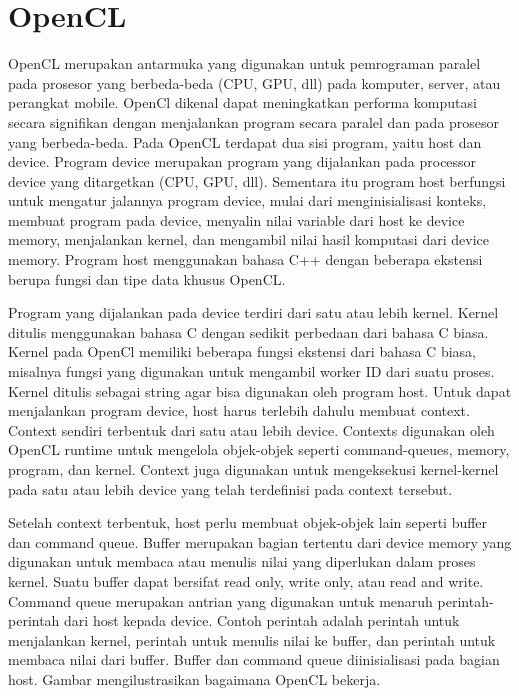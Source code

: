 \section{OpenCL}
OpenCL merupakan antarmuka yang digunakan untuk pemrograman paralel pada prosesor yang berbeda-beda (CPU, GPU, dll) pada komputer, server, atau perangkat mobile. 
OpenCl dikenal dapat meningkatkan performa komputasi secara signifikan dengan menjalankan program secara paralel dan pada prosesor yang berbeda-beda.
Pada OpenCL terdapat dua sisi program, yaitu host dan device. Program device merupakan program yang dijalankan pada processor device yang ditargetkan (CPU, GPU, dll). Sementara itu program host berfungsi untuk mengatur jalannya program device, mulai dari menginisialisasi konteks, membuat program pada device, menyalin nilai variable dari host ke device memory, menjalankan kernel, dan mengambil nilai hasil komputasi dari device memory. Program host menggunakan bahasa C++ dengan beberapa ekstensi berupa fungsi dan tipe data khusus OpenCL.

Program yang dijalankan pada device terdiri dari satu atau lebih kernel. Kernel ditulis menggunakan bahasa C dengan sedikit perbedaan dari bahasa C biasa. Kernel pada OpenCl memiliki beberapa fungsi ekstensi dari bahasa C biasa, misalnya fungsi yang digunakan untuk mengambil worker ID dari suatu proses. 
Kernel ditulis sebagai string agar bisa digunakan oleh program host. Untuk dapat menjalankan program device, host harus terlebih dahulu membuat context. Context sendiri terbentuk dari satu atau lebih device. Contexts digunakan oleh OpenCL runtime untuk mengelola objek-objek seperti command-queues, memory, program, dan kernel. Context juga digunakan untuk mengeksekusi kernel-kernel pada satu atau lebih device yang telah terdefinisi pada context tersebut.

Setelah context terbentuk, host perlu membuat objek-objek lain seperti buffer dan command queue. Buffer merupakan bagian tertentu dari device memory yang digunakan untuk membaca atau menulis nilai yang diperlukan dalam proses kernel. Suatu buffer dapat bersifat read only, write only, atau read and write. Command queue merupakan antrian yang digunakan untuk menaruh perintah-perintah dari host kepada device. Contoh perintah adalah perintah untuk menjalankan kernel, perintah untuk menulis nilai ke buffer, dan perintah untuk membaca nilai dari buffer. Buffer dan command queue diinisialisasi pada bagian host. Gambar mengilustrasikan bagaimana OpenCL bekerja.

